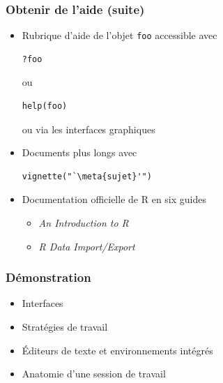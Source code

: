 \begin{frame}[fragile=singleslide]
  \frametitle{Obtenir de l'aide (suite)}

  \begin{itemize}
  \item Rubrique d'aide de l'objet \texttt{foo} accessible avec
    \begin{Schunk}
\begin{lstlisting}
?foo
\end{lstlisting}
    \end{Schunk}
    ou
    \begin{Schunk}
\begin{lstlisting}
help(foo)
\end{lstlisting}
    \end{Schunk}
    ou via les interfaces graphiques
  \item Documents plus longs avec
    \begin{Schunk}
\begin{lstlisting}
vignette("`\meta{sujet}'")
\end{lstlisting}
    \end{Schunk}
  \item Documentation officielle de R en six guides
    \begin{itemize}
    \item \emph{An Introduction to R}
    \item \emph{R Data Import/Export}
    \end{itemize}
  \end{itemize}
\end{frame}

\begin{frame}
  \frametitle{Démonstration}
  \begin{itemize}
  \item Interfaces
  \item Stratégies de travail
  \item Éditeurs de texte et environnements intégrés
  \item Anatomie d'une session de travail
  \end{itemize}

\end{frame}

